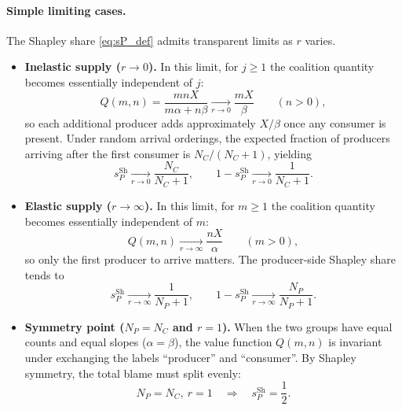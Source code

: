 \documentclass[journal, a4paper]{IEEEtran}
\begin{document}
\paragraph{Simple limiting cases.}
The Shapley share \eqref{eq:sP_def} admits transparent limits as $r$ varies.

\begin{itemize}
\item \textbf{Inelastic supply ($r\to 0$).} In this limit, for $j\ge 1$ the coalition quantity becomes essentially independent of $j$:
\begin{equation}
Q(m,n)=\frac{mnX}{m\alpha+n\beta}\xrightarrow[r\to 0]{}\frac{mX}{\beta}\qquad (n>0),
\end{equation}
so each additional producer adds approximately $X/\beta$ once any consumer is present. Under random arrival orderings, the expected fraction of producers arriving after the first consumer is $N_C/(N_C+1)$, yielding
\begin{equation}
s_P^{\mathrm{Sh}} \xrightarrow[r\to 0]{} \frac{N_C}{N_C+1},
\qquad
1-s_P^{\mathrm{Sh}} \xrightarrow[r\to 0]{} \frac{1}{N_C+1}.
\label{eq:limit_r0}
\end{equation}

\item \textbf{Elastic supply ($r\to \infty$).} In this limit, for $m\ge 1$ the coalition quantity becomes essentially independent of $m$:
\begin{equation}
Q(m,n)\xrightarrow[r\to \infty]{}\frac{nX}{\alpha}\qquad (m>0),
\end{equation}
so only the first producer to arrive matters. The producer-side Shapley share tends to
\begin{equation}
s_P^{\mathrm{Sh}} \xrightarrow[r\to \infty]{} \frac{1}{N_P+1},
\qquad
1-s_P^{\mathrm{Sh}} \xrightarrow[r\to \infty]{} \frac{N_P}{N_P+1}.
\label{eq:limit_rinf}
\end{equation}

\item \textbf{Symmetry point ($N_P=N_C$ and $r=1$).} When the two groups have equal counts and equal slopes ($\alpha=\beta$), the value function $Q(m,n)$ is invariant under exchanging the labels ``producer'' and ``consumer''. By Shapley symmetry, the total blame must split evenly:
\begin{equation}
N_P=N_C,\ r=1
\quad\Rightarrow\quad
s_P^{\mathrm{Sh}}=\frac{1}{2}.
\label{eq:symmetry_half}
\end{equation}
\end{itemize}
\end{document}
